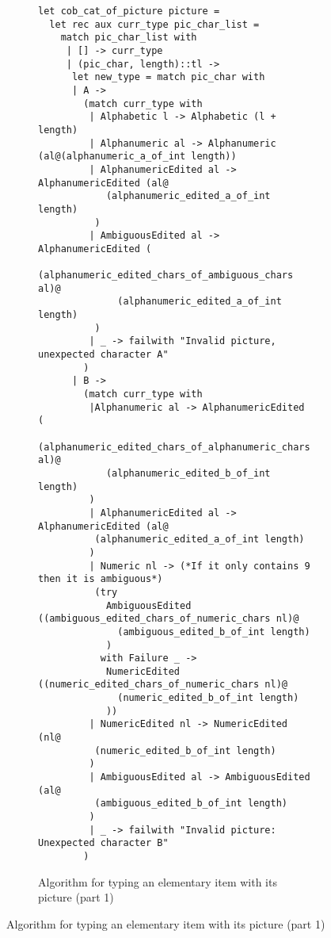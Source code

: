 \documentclass[a4paper,10pt]{article}
\begin{document}
\begin{figure}[!ht]
  \begin{subfigure}{1.05\textwidth}
    \begin{verbatim}
let cob_cat_of_picture picture =
  let rec aux curr_type pic_char_list =
    match pic_char_list with
     | [] -> curr_type
     | (pic_char, length)::tl ->
      let new_type = match pic_char with
      | A ->
        (match curr_type with
         | Alphabetic l -> Alphabetic (l + length)
         | Alphanumeric al -> Alphanumeric (al@(alphanumeric_a_of_int length))
         | AlphanumericEdited al -> AlphanumericEdited (al@
            (alphanumeric_edited_a_of_int length)
          )
         | AmbiguousEdited al -> AlphanumericEdited (
            (alphanumeric_edited_chars_of_ambiguous_chars al)@
              (alphanumeric_edited_a_of_int length)
          )
         | _ -> failwith "Invalid picture, unexpected character A"
        )
      | B ->
        (match curr_type with
         |Alphanumeric al -> AlphanumericEdited (
          (alphanumeric_edited_chars_of_alphanumeric_chars al)@
            (alphanumeric_edited_b_of_int length)
         )
         | AlphanumericEdited al -> AlphanumericEdited (al@
          (alphanumeric_edited_a_of_int length)
         )
         | Numeric nl -> (*If it only contains 9 then it is ambiguous*)
          (try
            AmbiguousEdited ((ambiguous_edited_chars_of_numeric_chars nl)@
              (ambiguous_edited_b_of_int length)
            )
           with Failure _ ->
            NumericEdited ((numeric_edited_chars_of_numeric_chars nl)@
              (numeric_edited_b_of_int length)
            ))
         | NumericEdited nl -> NumericEdited (nl@
          (numeric_edited_b_of_int length)
         )
         | AmbiguousEdited al -> AmbiguousEdited (al@
          (ambiguous_edited_b_of_int length)
         )
         | _ -> failwith "Invalid picture: Unexpected character B"
        )
    \end{verbatim}
    \caption{Algorithm for typing an elementary item with its picture (part 1)}
    \label{fig:algo_typ_elem_pic_1}
  \end{subfigure}
\end{figure}
\end{document}
